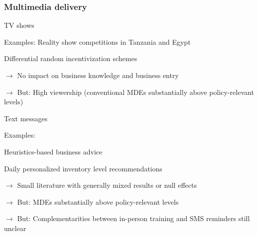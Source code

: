 \documentclass[hideothersubsections, usenames,dvipsnames,11pt]{beamer}
\newenvironment{itemize_2pt}{\itemize\addtolength{\itemsep}{2pt}}{\enditemize}
\begin{document}
\begin{frame}
\frametitle{Multimedia delivery}
TV shows
\begin{itemize_2pt}
	\item Examples: \textcolor{bdf}{Reality show competitions} in Tanzania \citep{Bjorvatn2020} and Egypt \citep{Barsoum2018}
	\item Differential random incentivization schemes
	\item[] $\rightarrow$ No impact on business knowledge and business entry 
	\item[] $\rightarrow$ But: \textcolor{bdf}{High viewership} (conventional MDEs substantially above policy-relevant levels) 
 
\end{itemize_2pt}

\pause
	
\vspace{1.0em}
	
Text messages
\begin{itemize_2pt}
	\item Examples: 
	\begin{itemize_2pt}
		\item Heuristics-based business advice \citep{Cole2018}
		\item Daily personalized inventory level recommendations \citep{Acimovic2020}
	\end{itemize_2pt}
	\item[] $\rightarrow$ Small literature with generally \textcolor{camel}{mixed results or null effects}
	\item[] $\rightarrow$ But: \textcolor{bdf}{MDEs substantially above policy-relevant levels}
	\item[] $\rightarrow$ But: \textcolor{bdf}{Complementarities} between in-person training and SMS reminders still unclear
\end{itemize_2pt}
\end{frame}



\end{document}
